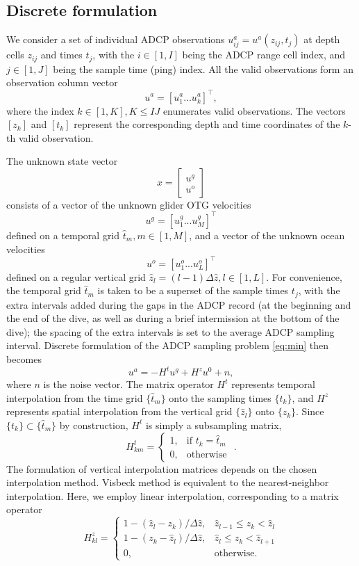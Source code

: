 \subsection{Discrete formulation}
We consider a set of individual ADCP observations $u^a_{ij}=u^a(z_{ij},t_j)$ at depth cells $z_{ij}$ and times $t_j$, with the
 $i\in [1,I]$ being the ADCP range cell index, and $j\in [1,J]$ being the sample time (ping) index.  All the valid observations form an observation column vector 
$$u^a=[u^a_1...u^a_k]^\top,$$
where the index $k\in [1, K], K\le IJ$ enumerates valid observations. The vectors $[z_k]$ and $[t_k]$ represent the corresponding depth and time coordinates of the $k$-th valid observation.


The unknown state vector 
$$x=\begin{bmatrix}
{u^g} \\ u^o
\end{bmatrix}$$
consists of a vector of the unknown glider OTG velocities 
$${u^g}= [u^g_1 ... u^g_M]^\top$$ 
defined on a temporal grid $\hat{t}_m, m\in[1,M]$, and a vector of the unknown ocean velocities 
$$u^o=[u^o_1 ... u^o_L]^\top$$
defined on a regular vertical grid $\hat{z}_l=(l-1)\Delta \hat{z}, l\in [1,L]$. For convenience, the temporal grid $\hat{t}_m$ is taken to be a superset of the sample times $t_j$, with the extra intervals added during the gaps in the ADCP record (at the beginning and the end of the dive, as well as during a brief intermission at the bottom of the dive); the spacing of the extra intervals is set to the average ADCP sampling interval.
Discrete formulation of the ADCP sampling problem \eqref{eq:min} then becomes 
$$
u^a= - H^t u^g + H^z u^0 + n, %
$$
where $n$ is the noise vector.
The matrix operator $H^t$ represents temporal interpolation from the time grid $\{\hat{t}_m\}$ onto the sampling times $\{t_k\}$, and 
$H^{z}$ represents spatial interpolation from the vertical grid $\{\hat{z}_l\}$ onto $\{z_k\}$.
Since $\{t_k\}\subset \{\hat{t}_m\}$ by construction, $H^t$ is simply a subsampling matrix,
$$
H^t_{km}=\begin{cases} 1,&\text{if }t_k = \hat{t}_m\\0,&\text{otherwise } \end{cases}.
$$
The formulation of vertical interpolation matrices depends on the chosen interpolation method. Visbeck \cite{Visbeck2002} method is equivalent to the nearest-neighbor interpolation. Here, we employ linear interpolation, corresponding to a matrix operator
$$
H^z_{kl}=\begin{cases}
1-(\hat{z}_l-z_k)/\Delta \hat{z},&\hat{z}_{l-1} \le z_k <\hat{z}_l\\
1-(z_k-\hat{z}_l)/\Delta \hat{z},&\hat{z}_l \le z_k <\hat{z}_{l+1}\\
0,& \text{otherwise.}
\end{cases}
$$

